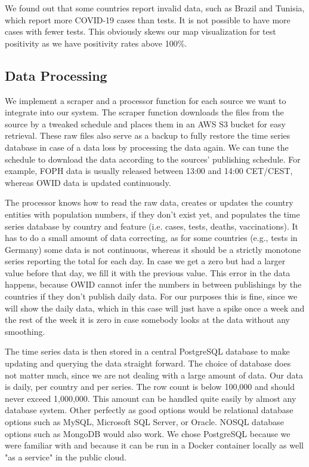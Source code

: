 We found out that some countries report invalid data, such as Brazil and Tunisia, which report more COVID-19 cases than tests. It is not possible to have more cases with fewer tests. This obviously skews our map visualization for test positivity as we have positivity rates above 100\%.

\subsection{Data Processing}

We implement a scraper and a processor function for each source we want to integrate into our system. The scraper function downloads the files from the source by a tweaked schedule and places them in an AWS S3 bucket for easy retrieval. These raw files also serve as a backup to fully restore the time series database in case of a data loss by processing the data again. We can tune the schedule to download the data according to the sources' publishing schedule. For example, FOPH data is usually released between 13:00 and 14:00 CET/CEST, whereas OWID data is updated continuously.

The processor knows how to read the raw data, creates or updates the country entities with population numbers, if they don't exist yet, and populates the time series database by country and feature (i.e. cases, tests, deaths, vaccinations). It has to do a small amount of data correcting, as for some countries (e.g., tests in Germany) some data is not continuous, whereas it should be a strictly monotone series reporting the total for each day. In case we get a zero but had a larger value before that day, we fill it with the previous value. This error in the data happens, because OWID cannot infer the numbers in between publishings by the countries if they don't publish daily data. For our purposes this is fine, since we will show the daily data, which in this case will just have a spike once a week and the rest of the week it is zero in case somebody looks at the data without any smoothing.

The time series data is then stored in a central PostgreSQL database to make updating and querying the data straight forward. The choice of database does not matter much, since we are not dealing with a large amount of data. Our data is daily, per country and per series. The row count is below 100,000 and should never exceed 1,000,000. This amount can be handled quite easily by almost any database system. Other perfectly as good options would be relational database options such as MySQL, Microsoft SQL Server, or Oracle. NOSQL database options such as MongoDB would also work. We chose PostgreSQL because we were familiar with and because it can be run in a Docker container locally as well "as a service" in the public cloud.

